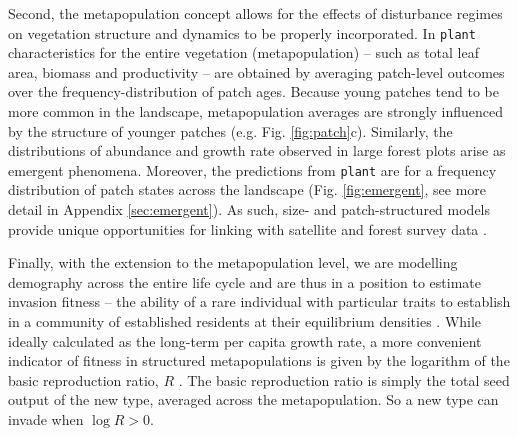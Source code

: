 \documentclass[a4paper,11pt]{article}
\newcommand{\plant}{\texttt{plant}}
\begin{document}
Second, the metapopulation concept allows for the effects of disturbance
regimes on vegetation structure and dynamics to be properly incorporated. In
{\plant} characteristics for the entire vegetation (metapopulation) -- such
as total leaf area, biomass and productivity -- are obtained by averaging
patch-level outcomes over the frequency-distribution of patch ages. Because
young patches tend to be more common in the landscape, metapopulation averages are
strongly influenced by the structure of younger patches (e.g.
Fig. \ref{fig:patch}c).  Similarly, the distributions of  abundance and growth rate
observed in large forest  plots \citep[e.g.][]{Muller-2006, Coomes-2007} arise
as  emergent phenomena. Moreover, the predictions from {\plant}
are for a frequency distribution of patch states across the landscape
(Fig. \ref{fig:emergent}, see more detail in Appendix \ref{sec:emergent}). As such,
size- and patch-structured models provide unique opportunities for linking with
satellite and forest survey data \citep{Moorcroft-2001, Purves-2008}.

Finally, with the extension to the metapopulation level, we are
modelling demography across the entire life cycle and are thus in a
position to estimate invasion fitness -- the ability of a rare
individual with particular traits to establish in a community of
established residents at their equilibrium densities
\citep{Metz-1992, Geritz-1998}.  While ideally calculated as the
long-term per capita growth rate, a more convenient indicator of
fitness in structured metapopulations is given by the
logarithm of the basic reproduction ratio, \(R\)
\citep{Gyllenberg-2001, Metz-2001}.
The basic reproduction ratio is simply the total seed output of
the new type, averaged across the metapopulation. So a new type can
invade when \(\log R > 0\).
\end{document}
